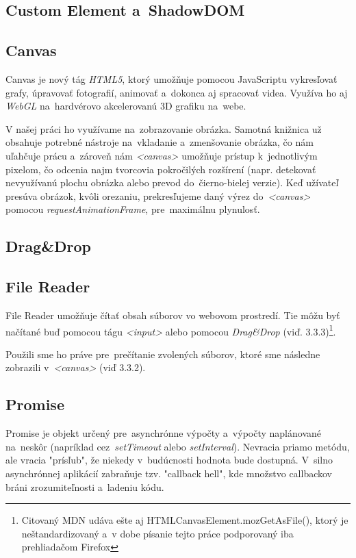 \subsection{Custom Element a~ShadowDOM}
\subsection{Canvas}

Canvas je nový tág \emph{HTML5}, ktorý umožňuje pomocou JavaScriptu vykresľovať grafy, úpravovať fotografií, animovať a~dokonca aj spracovať videa. Využíva ho aj \emph{WebGL} na~hardvérovo akcelerovanú 3D grafiku na~webe\cite{MDN_Canvas}.

V našej práci ho využívame na~zobrazovanie obrázka. Samotná knižnica už obsahuje potrebné nástroje na~vkladanie a~zmenšovanie obrázka, čo nám uľahčuje prácu a~zároveň nám \emph{<canvas>} umožňuje prístup k~jednotlivým pixelom, čo odcenia najm tvorcovia pokročilých rozšírení (napr. detekovať nevyužívanú plochu obrázka alebo prevod do~čierno-bielej verzie). Keď užívateľ presúva obrázok, kvôli orezaniu, prekresľujeme daný výrez do~\emph{<canvas>} pomocou \emph{requestAnimationFrame}\cite{MDN_RequestAnimationFrame}, pre~maximálnu plynulosť.

\subsection{Drag&Drop}
\subsection{File Reader}

File Reader umožňuje čítať obsah súborov vo webovom prostredí. Tie môžu byť načítané buď pomocou tágu \emph{<input>} alebo pomocou \emph{Drag&Drop} (viď. 3.3.3)\cite{MDN_FileReader}\footnote{Citovaný MDN udáva ešte aj HTMLCanvasElement.mozGetAsFile(), ktorý je neštandardizovaný a~v dobe písanie tejto práce podporovaný iba prehliadačom Firefox}.

Použili sme ho práve pre~prečítanie zvolených súborov, ktoré sme následne zobrazili v~\emph{<canvas>} (viď 3.3.2).

\subsection{Promise}

Promise je objekt určený pre~asynchrónne výpočty a~výpočty naplánované na~neskôr (napríklad cez~\emph{setTimeout} alebo \emph{setInterval}). Nevracia priamo metódu, ale vracia "prísľub", že niekedy v~budúcnosti hodnota bude dostupná\cite{MDN_Promise}. V~silno asynchrónnej aplikácií zabraňuje tzv. "callback hell", kde množstvo callbackov bráni zrozumiteľnosti a~ladeniu kódu.

